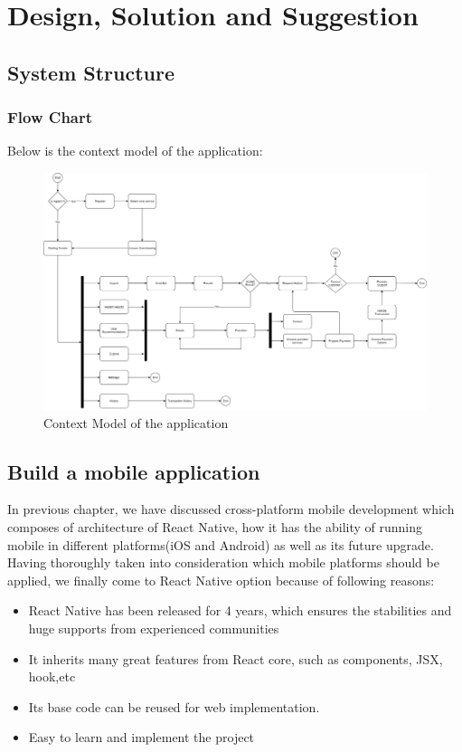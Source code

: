 \chapter{Design, Solution and Suggestion}

\section{System Structure}
\subsection{Flow Chart}
Below is the context model of the application:

\begin{figure}[!h]
	\centering
	\includegraphics[scale=0.25]{Picture/architecture/context-model.png}
	\caption{Context Model of the application}
\label{fig:context-model}
\end{figure}

\section{Build a mobile application}
In previous chapter, we have discussed cross-platform mobile development which composes of
architecture of React Native, how it has the ability of running mobile in different platforms(iOS and Android)
as well as its future upgrade. 
Having thoroughly taken into consideration which mobile platforms should be applied, we finally come to React Native option
because of following reasons: 
\begin{itemize}
    \item React Native has been released for 4 years, which ensures the stabilities and huge supports from experienced communities 
    \item It inherits many great features from React core, such as components, JSX, hook,etc
    \item Its base code can be reused for web implementation. 
    \item Easy to learn and implement the project 
\end{itemize}

